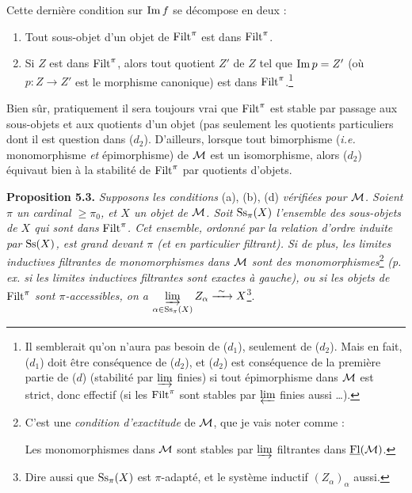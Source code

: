 Cette dernière condition sur $\mathrm{Im}\, f$ se décompose en deux :

\begin{enumerate}[nosep]
\item[$d_1$)] Tout sous-objet d'un objet de $\mathrm{Filt}^{\pi}$ est dans $\mathrm{Filt}^{\pi}$.
\item[$d_2$)] Si $Z$ est dans $\mathrm{Filt}^{\pi}$, alors tout quotient $Z'$ de $Z$ tel que $\mathrm{Im}\, p = Z'$ (où $p : Z \longrightarrow Z'$ est le morphisme canonique) est dans $\mathrm{Filt}^{\pi}$.\footnote[17]{Il semblerait qu'on n'aura pas besoin de ($d_1$), seulement de ($d_2$). Mais en fait, ($d_1$) doit être conséquence de ($d_2$), et ($d_2$) est conséquence de la première partie de ($d$) (stabilité par $\varinjlim$ finies) si tout épimorphisme dans $\mathcal{M}$ est strict, donc effectif (si les $\mathrm{Filt}^{\pi}$ sont stables par $\varprojlim$ finies aussi \ldots).}
\end{enumerate}


Bien sûr, pratiquement il sera toujours vrai que $\mathrm{Filt}^{\pi}$ est stable par passage aux sous-objets et aux quotients d'un objet (pas seulement les quotients particuliers dont il est question dans ($d_2$). %
D'ailleurs, lorsque tout bimorphisme (\textit{i.e.} monomorphisme \textit{et} épimorphisme) de $\mathcal{M}$ est un isomorphisme, alors ($d_2$) équivaut bien à la stabilité de $\mathrm{Filt}^{\pi}$ par quotients d'objets.

\textbf{Proposition 5.3.} \textit{Supposons les conditions} (a), (b), (d) \textit{vérifiées pour $\mathcal{M}$. Soient $\pi$ un cardinal $\geq \pi_0$, et $X$ un objet de $\mathcal{M}$. Soit} $\mathrm{Ss}_{\pi}(X)$ \textit{l'ensemble des sous-objets de $X$ qui sont dans} $\mathrm{Filt}^{\pi}$\textit{. Cet ensemble, ordonné par la relation d'ordre induite par} $\mathrm{Ss}(X)$\textit{, est grand devant $\pi$ (et en particulier filtrant). Si de plus, les limites inductives filtrantes de monomorphismes dans $\mathcal{M}$ sont des monomorphismes}\footnote[18]{C'est une \textit{condition d'exactitude} de $\mathcal{M}$, que je vais noter comme :\par
\noindent{}\quad Les monomorphismes dans $\mathcal{M}$ sont stables par $\varinjlim$ filtrantes dans $\underline{\mathrm{Fl}}(\mathcal{M})$.} \textit{(p. ex. si les limites inductives filtrantes sont exactes à gauche), ou si les objets de} $\mathrm{Filt}^{\pi}$ \textit{sont $\pi$-accessibles, on a $\varinjlim\limits_{\alpha\in\mathrm{Ss}_{\pi}(X)} Z_{\alpha} \xrightarrow{\ \sim\ } X$}\footnote[19]{Dire aussi que $\mathrm{Ss}_{\pi}(X)$ est $\pi$-adapté, et le système inductif $(Z_{\alpha})_{\alpha}$ aussi.}.

